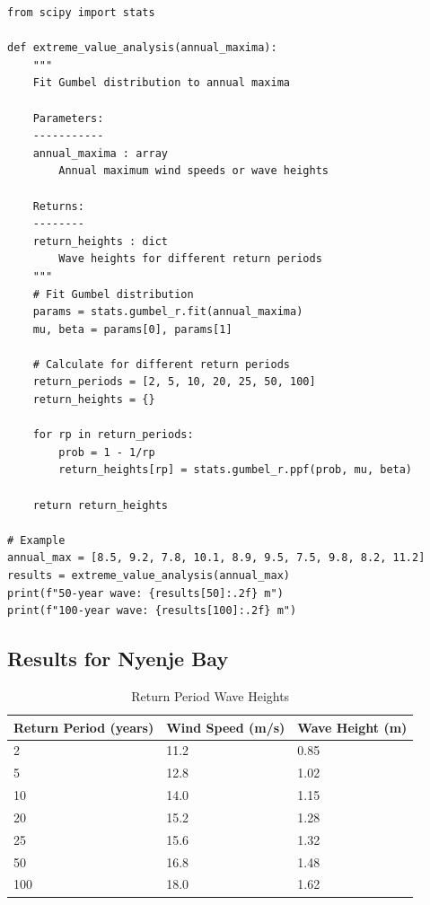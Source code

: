 \documentclass[12pt]{article}
\begin{document}
\begin{lstlisting}[caption=Gumbel Extreme Value Analysis]
from scipy import stats

def extreme_value_analysis(annual_maxima):
    """
    Fit Gumbel distribution to annual maxima
    
    Parameters:
    -----------
    annual_maxima : array
        Annual maximum wind speeds or wave heights
    
    Returns:
    --------
    return_heights : dict
        Wave heights for different return periods
    """
    # Fit Gumbel distribution
    params = stats.gumbel_r.fit(annual_maxima)
    mu, beta = params[0], params[1]
    
    # Calculate for different return periods
    return_periods = [2, 5, 10, 20, 25, 50, 100]
    return_heights = {}
    
    for rp in return_periods:
        prob = 1 - 1/rp
        return_heights[rp] = stats.gumbel_r.ppf(prob, mu, beta)
    
    return return_heights

# Example
annual_max = [8.5, 9.2, 7.8, 10.1, 8.9, 9.5, 7.5, 9.8, 8.2, 11.2]
results = extreme_value_analysis(annual_max)
print(f"50-year wave: {results[50]:.2f} m")
print(f"100-year wave: {results[100]:.2f} m")
\end{lstlisting}

\subsection{Results for Nyenje Bay}

\begin{table}[H]
\centering
\caption{Return Period Wave Heights}
\begin{tabular}{|l|l|l|}
\hline
\textbf{Return Period (years)} & \textbf{Wind Speed (m/s)} & \textbf{Wave Height (m)} \\
\hline
2 & 11.2 & 0.85 \\
5 & 12.8 & 1.02 \\
10 & 14.0 & 1.15 \\
20 & 15.2 & 1.28 \\
25 & 15.6 & 1.32 \\
50 & 16.8 & 1.48 \\
100 & 18.0 & 1.62 \\
\hline
\end{tabular}
\end{table}

\newpage
\end{document}
